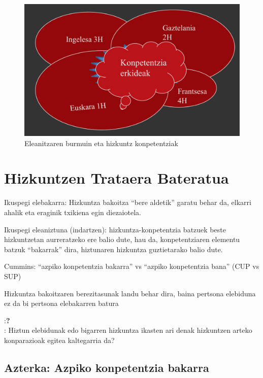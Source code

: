 \documentclass[
]{book}
\begin{document}
\begin{figure}
\centering
\includegraphics{Pictures/Screenshot_20201007_125328.png}
\caption{Eleanitzaren burmuin eta hizkuntz konpetentziak}
\end{figure}

\hypertarget{hizkuntzen-trataera-bateratua-1}{%
\section{Hizkuntzen Trataera Bateratua}\label{hizkuntzen-trataera-bateratua-1}}

Ikuspegi elebakarra: Hizkuntza bakoitza ``bere aldetik'' garatu behar da, elkarri ahalik eta eraginik txikiena egin diezaiotela.

Ikuspegi eleaniztuna (indartzen): hizkuntza-konpetentzia batzuek beste hizkuntzetan aurreratzeko ere balio dute, hau da, konpetentziaren elementu batzuk ``bakarrak'' dira, hiztunaren hizkuntza guztietarako balio dute.

Cummins: ``azpiko konpetentzia bakarra'' vs ``azpiko konpetentzia bana'' (CUP vs SUP)

Hizkuntza bakoitzaren berezitasunak landu behar dira, baina pertsona elebiduna ez da bi pertsona elebakarren batura

:\textbf{?}\\
: Hiztun elebidunak edo bigarren hizkuntza ikasten ari denak hizkuntzen arteko konparazioak egitea kaltegarria da?

\hypertarget{azterka-azpiko-konpetentzia-bakarra}{%
\subsection{Azterka: Azpiko konpetentzia bakarra}\label{azterka-azpiko-konpetentzia-bakarra}}
\end{document}

